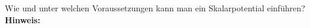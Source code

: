 \begin{question}[section=3,subsection=31,name={Elektrostatisches Skalarpotential},difficulty=2,type=mdl,mode=exm,tags={}]
	Wie und unter welchen Voraussetzungen kann man ein Skalarpotential einführen?
	\\ \textbf{Hinweis:}\\
	
\end{question}
\begin{solution}
	
\end{solution}